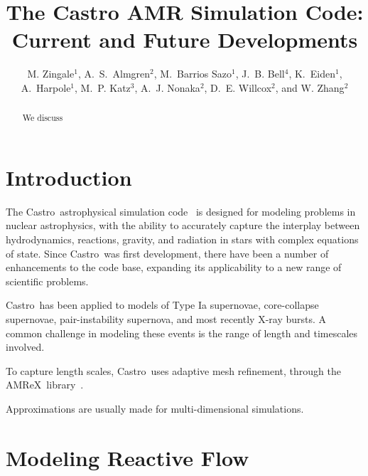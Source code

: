 \documentclass[a4paper]{jpconf}
\newcommand{\castro}{{\sffamily Castro}}
\newcommand{\amrex}{{\sffamily AMReX}}
\begin{document}
\title{The Castro AMR Simulation Code: Current and Future Developments}

\author{M. Zingale$^1$,
        A.~S.~Almgren$^2$,
        M.~Barrios Sazo$^1$,
        J.~B. Bell$^4$,
        K.~Eiden$^1$,
        A.~Harpole$^1$,
        M.~P. Katz$^3$,
        A.~J. Nonaka$^2$,
        D.~E. Willcox$^2$, and
        W. Zhang$^2$}

\address{$^1$Department of Physics and Astronomy, Stony Brook
  University, Stony Brook, NY 11794-3800 USA}

\address{$^2$Center for Computational Sciences and Engineering,
  Lawrence Berkeley National Lab, Berkeley, CA 94720 USA}

\address{$^3$NVIDIA Corporation, 2788 San Tomas Expressway,
  Santa Clara, CA, 95050 USA}


\begin{abstract}
We discuss 
\end{abstract}



\section{Introduction}

The \castro\ astrophysical simulation code~\cite{castro} is designed
for modeling problems in nuclear astrophysics, with the ability to
accurately capture the interplay between hydrodynamics, reactions,
gravity, and radiation in stars with complex equations of state.
Since \castro\ was first development, there have been a number of
enhancements to the code base, expanding its applicability to a new
range of scientific problems.

\castro\ has been applied to models of Type Ia supernovae,
core-collapse supernovae, pair-instability supernova, and most
recently X-ray bursts.  A common challenge in modeling these events is
the range of length and timescales involved.  

To capture length scales, \castro\ uses adaptive mesh refinement,
through the \amrex\ library~\cite{amrex_joss}.

Approximations are usually made for multi-dimensional simulations.

\section{Modeling Reactive Flow}
\end{document}
